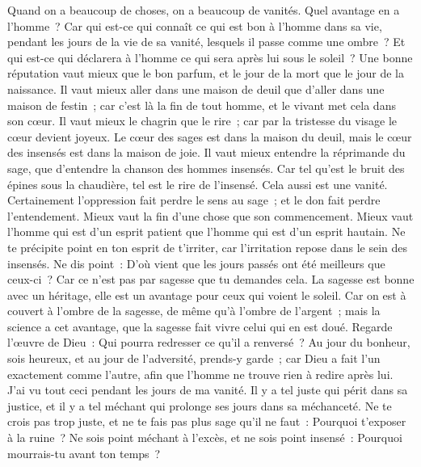 \begin{multicols}{2}
Quand on a beaucoup de choses, on a beaucoup de vanités. Quel avantage en a l'homme~?
Car qui est-ce qui connaît ce qui est bon à l'homme dans sa vie, pendant les jours de la vie de sa vanité, lesquels il passe comme une ombre~? Et qui est-ce qui déclarera à l'homme ce qui sera après lui sous le soleil~?
\VerseOne{}Une bonne réputation vaut mieux que le bon parfum, et le jour de la mort que le jour de la naissance.
Il vaut mieux aller dans une maison de deuil que d'aller dans une maison de festin~; car c'est là la fin de tout homme, et le vivant met cela dans son cœur.
Il vaut mieux le chagrin que le rire~; car par la tristesse du visage le cœur devient joyeux.
Le cœur des sages est dans la maison du deuil, mais le cœur des insensés est dans la maison de joie.
Il vaut mieux entendre la réprimande du sage, que d'entendre la chanson des hommes insensés.
Car tel qu'est le bruit des épines sous la chaudière, tel est le rire de l'insensé. Cela aussi est une vanité.
Certainement l'oppression fait perdre le sens au sage~; et le don fait perdre l'entendement.
Mieux vaut la fin d'une chose que son commencement. Mieux vaut l'homme qui est d'un esprit patient que l'homme qui est d'un esprit hautain.
Ne te précipite point en ton esprit de t'irriter, car l'irritation repose dans le sein des insensés.
Ne dis point~: D'où vient que les jours passés ont été meilleurs que ceux-ci~? Car ce n'est pas par sagesse que tu demandes cela.
La sagesse est bonne avec un héritage, elle est un avantage pour ceux qui voient le soleil.
Car on est à couvert à l'ombre de la sagesse, de même qu'à l'ombre de l'argent~; mais la science a cet avantage, que la sagesse fait vivre celui qui en est doué.
Regarde l'œuvre de Dieu~: Qui pourra redresser ce qu'il a renversé~?
Au jour du bonheur, sois heureux, et au jour de l'adversité, prends-y garde~; car Dieu a fait l'un exactement comme l'autre, afin que l'homme ne trouve rien à redire après lui.
J'ai vu tout ceci pendant les jours de ma vanité. Il y a tel juste qui périt dans sa justice, et il y a tel méchant qui prolonge ses jours dans sa méchanceté.
Ne te crois pas trop juste, et ne te fais pas plus sage qu'il ne faut~: Pourquoi t'exposer à la ruine~?
Ne sois point méchant à l'excès, et ne sois point insensé~: Pourquoi mourrais-tu avant ton temps~?

\end{multicols}
